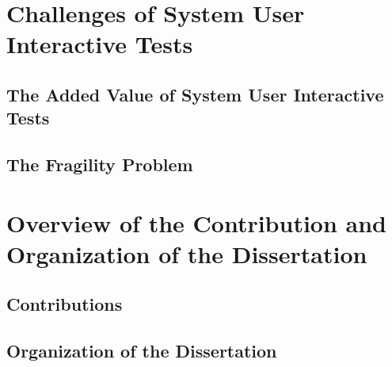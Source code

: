 \section{Challenges of System User Interactive Tests}

\subsection{The Added Value of System User Interactive Tests}

\subsection{The Fragility Problem}

\section{Overview of the Contribution and Organization of the Dissertation}
\subsection{Contributions}
\subsection{Organization of the Dissertation}